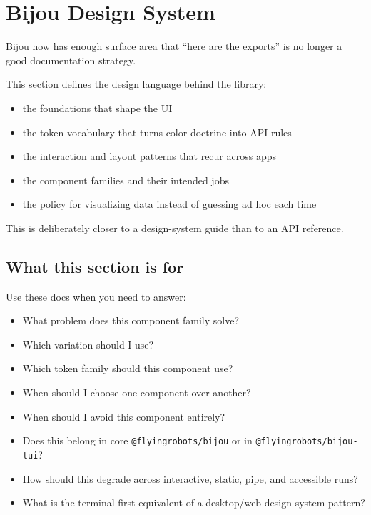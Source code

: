 \chapter{Bijou Design System}\label{record-017}

\smallskip

Bijou now has enough surface area that ``here are the exports'' is no longer a good documentation strategy.

This section defines the design language behind the library:

\begin{itemize}
\tightlist
\item
  the foundations that shape the UI
\item
  the token vocabulary that turns color doctrine into API rules
\item
  the interaction and layout patterns that recur across apps
\item
  the component families and their intended jobs
\item
  the policy for visualizing data instead of guessing ad hoc each time
\end{itemize}

This is deliberately closer to a design-system guide than to an API reference.

\section{What this section is for}\label{record-017-what-this-section-is-for}

Use these docs when you need to answer:

\begin{itemize}
\tightlist
\item
  What problem does this component family solve?
\item
  Which variation should I use?
\item
  Which token family should this component use?
\item
  When should I choose one component over another?
\item
  When should I avoid this component entirely?
\item
  Does this belong in core \texttt{@\allowbreak{}f\allowbreak{}l\allowbreak{}y\allowbreak{}i\allowbreak{}n\allowbreak{}g\allowbreak{}r\allowbreak{}o\allowbreak{}b\allowbreak{}o\allowbreak{}t\allowbreak{}s\allowbreak{}/\allowbreak{}b\allowbreak{}i\allowbreak{}j\allowbreak{}o\allowbreak{}u} or in \texttt{@\allowbreak{}f\allowbreak{}l\allowbreak{}y\allowbreak{}i\allowbreak{}n\allowbreak{}g\allowbreak{}r\allowbreak{}o\allowbreak{}b\allowbreak{}o\allowbreak{}t\allowbreak{}s\allowbreak{}/\allowbreak{}b\allowbreak{}i\allowbreak{}j\allowbreak{}o\allowbreak{}u\allowbreak{}-\allowbreak{}t\allowbreak{}u\allowbreak{}i}?
\item
  How should this degrade across interactive, static, pipe, and accessible runs?
\item
  What is the terminal-first equivalent of a desktop/web design-system pattern?
\end{itemize}

